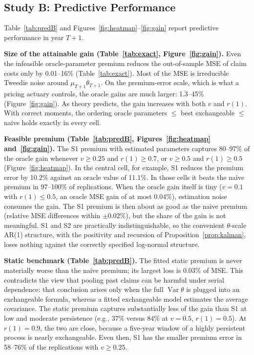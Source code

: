 \documentclass[mathematics,article,submit,moreauthors]{Definitions/mdpi}
\DeclareMathOperator{\Var}{Var}
\begin{document}
\subsection{Study B: Predictive Performance}

Table~\ref{tab:predB} and Figures~\ref{fig:heatmap}--\ref{fig:gain} report predictive performance in year $T+1$.

\textbf{Size of the attainable gain (Table~\ref{tab:exact}, Figure~\ref{fig:gain}).} Even the infeasible oracle-parameter premium reduces the out-of-sample MSE of claim costs only by 0.01--16\% (Table~\ref{tab:exact}). Most of the MSE is irreducible Tweedie noise around $\mu_{T+1}\theta_{T+1}$. On the premium-error scale, which is what a pricing actuary controls, the oracle gains are much larger: 1.3--45\% (Figure~\ref{fig:gain}). As theory predicts, the gain increases with both $v$ and $r(1)$. With correct moments, the ordering oracle parameters $\le$ best exchangeable $\le$ naive holds exactly in every cell.

\textbf{Feasible premium (Table~\ref{tab:predB}, Figures~\ref{fig:heatmap} and~\ref{fig:gain}).} The S1 premium with estimated parameters captures 80--97\% of the oracle gain whenever $v\ge0.25$ and $r(1)\ge0.7$, or $v\ge0.5$ and $r(1)\ge0.5$ (Figure~\ref{fig:heatmap}). In the central cell, for example, S1 reduces the premium error by 10.2\% against an oracle value of 11.1\%. In those cells it beats the naive premium in 97--100\% of replications. When the oracle gain itself is tiny ($v=0.1$ with $r(1)\le0.5$, an oracle MSE gain of at most 0.04\%), estimation noise consumes the gain. The S1 premium is then about as good as the naive premium (relative MSE differences within $\pm0.02\%$), but the share of the gain is not meaningful. S1 and S2 are practically indistinguishable, so the convenient $\theta$-scale AR(1) structure, with the positivity and recursion of Proposition~\ref{prop:kalman}, loses nothing against the correctly specified log-normal structure.

\textbf{Static benchmark (Table~\ref{tab:predB}).} The fitted static premium is never materially worse than the naive premium; its largest loss is 0.03\% of MSE. This contradicts the view that pooling past claims can be harmful under serial dependence: that conclusion arises only when the full $\Var\theta$ is plugged into an exchangeable formula, whereas a fitted exchangeable model estimates the average covariance. The static premium captures substantially less of the gain than S1 at low and moderate persistence (e.g., 37\% versus 84\% at $v=0.5$, $r(1)=0.5$). At $r(1)=0.9$, the two are close, because a five-year window of a highly persistent process is nearly exchangeable. Even then, S1 has the smaller premium error in 58--76\% of the replications with $v\ge0.25$.
\end{document}
